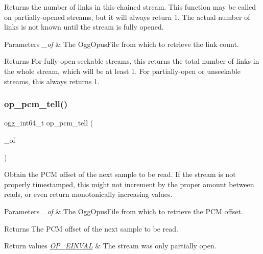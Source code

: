 Returns the number of links in this chained stream. This function may be called on partially-\/opened streams, but it will always return 1. The actual number of links is not known until the stream is fully opened. 
\begin{DoxyParams}{Parameters}
{\em \+\_\+of} & The {\ttfamily Ogg\+Opus\+File} from which to retrieve the link count. \\
\hline
\end{DoxyParams}
\begin{DoxyReturn}{Returns}
For fully-\/open seekable streams, this returns the total number of links in the whole stream, which will be at least 1. For partially-\/open or unseekable streams, this always returns 1. 
\end{DoxyReturn}
\mbox{\label{group__stream__info_gae07b8e40d883cd2a43edfec8c5bfa205}} 
\subsubsection{\texorpdfstring{op\_pcm\_tell()}{op\_pcm\_tell()}}
{\footnotesize\ttfamily ogg\+\_\+int64\+\_\+t op\+\_\+pcm\+\_\+tell (\begin{DoxyParamCaption}\item[{const Ogg\+Opus\+File $\ast$}]{\+\_\+of }\end{DoxyParamCaption})}

Obtain the P\+CM offset of the next sample to be read. If the stream is not properly timestamped, this might not increment by the proper amount between reads, or even return monotonically increasing values. 
\begin{DoxyParams}{Parameters}
{\em \+\_\+of} & The {\ttfamily Ogg\+Opus\+File} from which to retrieve the P\+CM offset. \\
\hline
\end{DoxyParams}
\begin{DoxyReturn}{Returns}
The P\+CM offset of the next sample to be read. 
\end{DoxyReturn}

\begin{DoxyRetVals}{Return values}
{\em \mbox{\hyperlink{group__error__codes_gae0879acafe9cc0ab72462d291fdb6fb6}{O\+P\+\_\+\+E\+I\+N\+V\+AL}}} & The stream was only partially open. \\
\hline
\end{DoxyRetVals}
\mbox{\label{group__stream__info_ga8c228c3d95f2c903ad6cfd2b78d8dad6}} 
